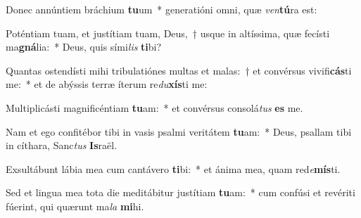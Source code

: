 \item Donec annúntiem bráchium \textbf{tu}um~* generatióni omni, quæ \textit{ven}\textbf{tú}ra est:
\item Poténtiam tuam, et justítiam tuam, Deus,~† usque in altíssima, quæ fecísti ma\textbf{gná}lia:~* Deus, quis sími\textit{lis} \textbf{ti}bi?
\item Quantas ostendísti mihi tribulatiónes multas et malas:~† et convérsus vivifi\textbf{cás}ti me:~* et de abýssis terræ íterum re\textit{du}\textbf{xís}ti me:
\item Multiplicásti magnificéntiam \textbf{tu}am:~* et convérsus consolá\textit{tus} \textbf{es} me.
\item Nam et ego confitébor tibi in vasis psalmi veritátem \textbf{tu}am:~* Deus, psallam tibi in cíthara, Sanc\textit{tus} \textbf{Is}raël.
\item Exsultábunt lábia mea cum cantávero \textbf{ti}bi:~* et ánima mea, quam red\textit{e}\textbf{mís}ti.
\item Sed et lingua mea tota die meditábitur justítiam \textbf{tu}am:~* cum confúsi et revériti fúerint, qui quærunt ma\textit{la} \textbf{mi}hi.
